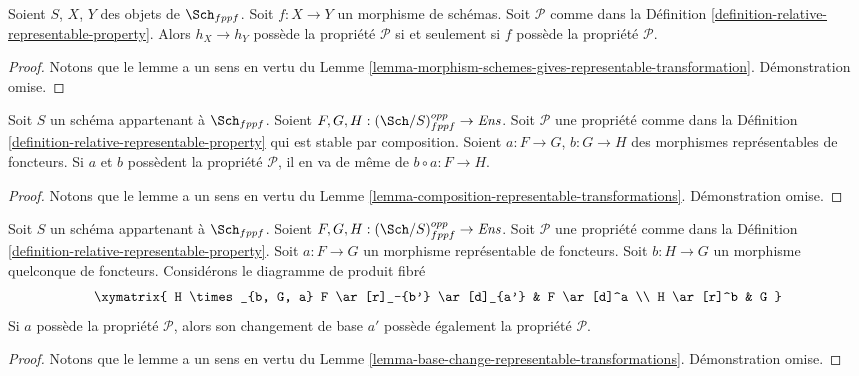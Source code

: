 \begin{lemma}
\label{lemma-morphism-schemes-gives-representable-transformation-property}
Soient $S$, $X$, $Y$ des objets de $\Sch_{fppf}$.
Soit $f : X \to Y$ un morphisme de schémas.
Soit $\mathcal{P}$ comme dans la
Définition \ref{definition-relative-representable-property}.
Alors $h_X \longrightarrow h_Y$ possède la propriété $\mathcal{P}$ si
et seulement si $f$ possède la propriété $\mathcal{P}$.
\end{lemma}

\begin{proof}
Notons que le lemme a un sens en vertu du
Lemme \ref{lemma-morphism-schemes-gives-representable-transformation}.
Démonstration omise.
\end{proof}

\begin{lemma}
\label{lemma-composition-representable-transformations-property}
Soit $S$ un schéma appartenant à $\Sch_{fppf}$.
Soient $F, G, H : (\Sch/S)_{fppf}^{opp} \to \textit{Ens}$.
Soit $\mathcal{P}$ une propriété comme dans la
Définition \ref{definition-relative-representable-property}
qui est stable par composition.
Soient $a : F \to G$, $b : G \to H$ des morphismes représentables de foncteurs.
Si $a$ et $b$ possèdent la propriété $\mathcal{P}$, il en va de même de
$b \circ a : F \longrightarrow H$.
\end{lemma}

\begin{proof}
Notons que le lemme a un sens en vertu du
Lemme \ref{lemma-composition-representable-transformations}.
Démonstration omise.
\end{proof}

\begin{lemma}
\label{lemma-base-change-representable-transformations-property}
Soit $S$ un schéma appartenant à $\Sch_{fppf}$.
Soient $F, G, H : (\Sch/S)_{fppf}^{opp} \to \textit{Ens}$.
Soit $\mathcal{P}$ une propriété comme dans la
Définition \ref{definition-relative-representable-property}.
Soit $a : F \to G$ un morphisme représentable de foncteurs.
Soit $b : H \to G$ un morphisme quelconque de foncteurs.
Considérons le diagramme de produit fibré
$$
\xymatrix{
H \times_{b, G, a} F \ar[r]_-{b'} \ar[d]_{a'} & F \ar[d]^a \\
H \ar[r]^b & G
}
$$
Si $a$ possède la propriété $\mathcal{P}$, alors son changement de base $a'$
possède également la propriété $\mathcal{P}$.
\end{lemma}

\begin{proof}
Notons que le lemme a un sens en vertu du
Lemme \ref{lemma-base-change-representable-transformations}.
Démonstration omise.
\end{proof}

